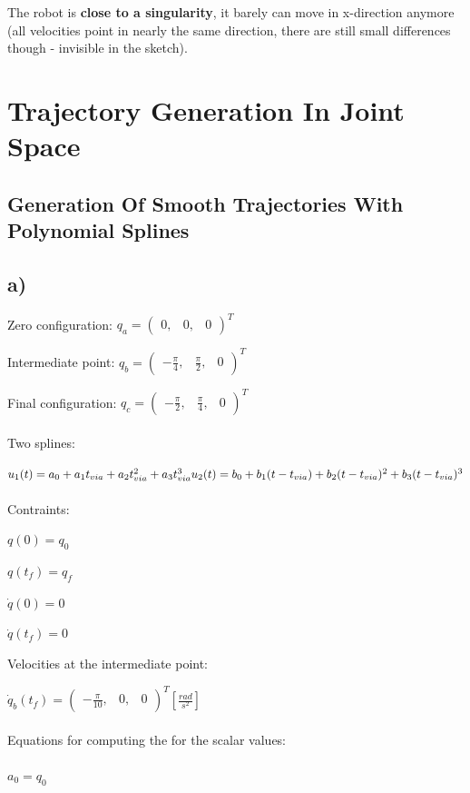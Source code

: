 \documentclass[a4paper,10pt]{article}
\begin{document}
The robot is \textbf{close to a singularity}, it barely can move in x-direction anymore (all velocities point in nearly the same direction, there are still small differences though - invisible in the sketch).

\newpage


\section{Trajectory Generation In Joint Space}

\subsection{Generation Of Smooth Trajectories With Polynomial Splines}
\subsection*{a)}
Zero configuration:
$q_a =
\begin{pmatrix}
	0,&0,&0
\end{pmatrix}^T
$

Intermediate point:
$q_b = 
\begin{pmatrix}
-\frac{\pi}{4}, &\frac{\pi}{2}, &0
\end{pmatrix}^T
$

Final configuration:
$q_c =
\begin{pmatrix}
-\frac{\pi}{2},&\frac{\pi}{4},&0
\end{pmatrix}^T
$
\\~\\
Two splines:

$
u_1(t) = a_0 +a_1t_{via} + a_2 t_{via}^2 + a_3 t_{via}^3\\
u_2(t) = b_0 +b_1(t-t_{via}) + b_2 (t-t_{via})^2 + b_3 (t-t_{via})^3
$
\\~\\
Contraints:

$q(0)=q_0$

$q(t_f)=q_f$

$\dot{q}(0)=0$

$\dot{q}(t_f)=0$



Velocities at the intermediate point:

$\dot{q}_b(t_f)=
\begin{pmatrix}
-\frac{\pi}{10},&0,&0
\end{pmatrix}^T [\frac{rad}{s^2}]
$
\\~\\
Equations for computing the for the scalar values:
\\~\\
$a_0=q_0$
\end{document}
